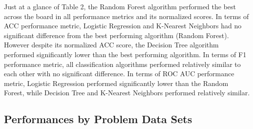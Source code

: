 \documentclass[twoside,11pt]{article}
\begin{document}
\vspace{10mm}
\noindent Just at a glance of Table 2, the Random Forest algorithm performed the best 
across the board in all performance metrics and its normalized scores. In terms of 
ACC performance metric, Logistic Regression and K-Nearest Neighbors had no 
significant difference from the best performing algorithm (Random Forest). However 
despite its normalized ACC score, the Decision Tree algorithm performed significantly 
lower than the best performing algorithm. In terms of F1 performance metric, all 
classification algorithms performed relatively similar to each other with no 
significant difference. In terms of ROC AUC performance metric, Logistic Regression 
performed significantly lower than the Random Forest, while Decision Tree and 
K-Nearest Neighbors performed relatively similar.

\subsection{Performances by Problem Data Sets}
\end{document}

